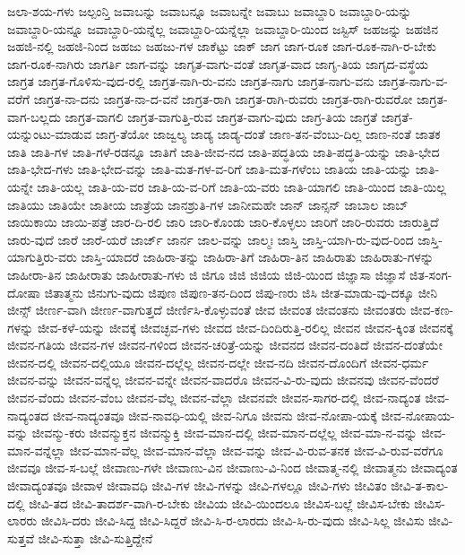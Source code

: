 {ಜಲಾ-ಶಯ-ಗಳು
ಜಲ್ಪಂನ್ತಿ
ಜವಾಬನ್ನು
ಜವಾಬನ್ನೂ
ಜವಾಬನ್ನೇ
ಜವಾಬು
ಜವಾಬ್ದಾರಿ
ಜವಾಬ್ದಾರಿ-ಯನ್ನು
ಜವಾಬ್ದಾರಿ-ಯನ್ನೂ
ಜವಾಬ್ದಾರಿ-ಯನ್ನೆಲ್ಲ
ಜವಾಬ್ದಾರಿ-ಯನ್ನೆಲ್ಲಾ
ಜವಾಬ್ದಾರಿ-ಯಿಂದ
ಜಸ್ಟಿಸ್
ಜಹಜನ್ನು
ಜಹಜಿನ
ಜಹಜಿ-ನಲ್ಲಿ
ಜಹಜಿ-ನಿಂದ
ಜಹಜು
ಜಹಜು-ಗಳ
ಜಾಕೆಟ್ಟು
ಜಾಕ್
ಜಾಗ
ಜಾಗ-ರೂಕ
ಜಾಗ-ರೂಕ-ನಾಗಿ-ರ-ಬೇಕು
ಜಾಗ-ರೂಕ-ನಾಗಿರು
ಜಾಗರ್ತಿ
ಜಾಗ-ವನ್ನು
ಜಾಗೃತ-ವಾಗು-ವಂತೆ
ಜಾಗೃತ-ವಾದ
ಜಾಗೃ-ತಿಯ
ಜಾಗೃದ-ವಸ್ಥೆಯ
ಜಾಗ್ರತ
ಜಾಗ್ರತ-ಗೊಳಿಸು-ವುದ-ರಲ್ಲಿ
ಜಾಗ್ರತ-ನಾಗಿ-ರು-ವನು
ಜಾಗ್ರತ-ನಾಗು
ಜಾಗ್ರತ-ನಾಗು-ವನು
ಜಾಗ್ರತ-ನಾಗು-ವ-ವರೆಗೆ
ಜಾಗ್ರತ-ನಾ-ದನು
ಜಾಗ್ರತ-ನಾ-ದ-ವನೆ
ಜಾಗ್ರತ-ರಾಗಿ
ಜಾಗ್ರತ-ರಾಗಿ-ರುವರು
ಜಾಗ್ರತ-ರಾಗಿ-ರುವರೋ
ಜಾಗ್ರತ-ವಾಗ-ಬಲ್ಲದು
ಜಾಗ್ರತ-ವಾಗಲಿ
ಜಾಗ್ರತ-ವಾಗುತ್ತಿ-ರುವ
ಜಾಗ್ರತ-ವಾಗು-ವುದು
ಜಾಗ್ರ-ತಿಯ
ಜಾಗ್ರತೆ
ಜಾಗ್ರತೆ-ಯನ್ನುಂಟು-ಮಾಡುವ
ಜಾಗ್ರ-ತೆಯೋ
ಜಾಜ್ವಲ್ಯ
ಜಾಡ್ಯ
ಜಾಡ್ಯ-ದಂತೆ
ಜಾಣ-ತನ-ವೆಂಬು-ದಿಲ್ಲ
ಜಾಣ-ನಂತೆ
ಜಾತಕ
ಜಾತಿ
ಜಾತಿ-ಗಳ
ಜಾತಿ-ಗಳೆ-ರಡನ್ನೂ
ಜಾತಿಗೆ
ಜಾತಿ-ಜೀವ-ನದ
ಜಾತಿ-ಪದ್ಧತಿಯ
ಜಾತಿ-ಪದ್ಧತಿ-ಯನ್ನು
ಜಾತಿ-ಭೇದ
ಜಾತಿ-ಭೇದ-ಗಳು
ಜಾತಿ-ಭೇದ-ವನ್ನು
ಜಾತಿ-ಮತ-ಗಳ-ವ-ರಿಗೆ
ಜಾತಿ-ಮತ-ಗಳೆಂಬ
ಜಾತಿಯ
ಜಾತಿ-ಯನ್ನು
ಜಾತಿ-ಯನ್ನೇ
ಜಾತಿ-ಯಲ್ಲ
ಜಾತಿ-ಯ-ವರ
ಜಾತಿ-ಯ-ವ-ರಿಗೆ
ಜಾತಿ-ಯ-ವರು
ಜಾತಿ-ಯಾಗಲಿ
ಜಾತಿ-ಯಿಂದ
ಜಾತಿ-ಯಿಲ್ಲ
ಜಾತಿಯು
ಜಾತಿಯೇ
ಜಾತೀಯ
ಜಾತ್ರೆಯ
ಜಾನಶ್ರುತಿ-ಗಳ
ಜಾನೀಮಹೇ
ಜಾನ್
ಜಾನ್ಸನ್
ಜಾಬಾಲ
ಜಾಬ್
ಜಾಯಿಕಾಯಿ
ಜಾಯಿ-ಪತ್ರೆ
ಜಾರ-ದಿ-ರಲಿ
ಜಾರಿ
ಜಾರಿ-ಕೊಂಡು
ಜಾರಿ-ಕೊಳ್ಳಲು
ಜಾರಿಗೆ
ಜಾರಿ-ರುವರು
ಜಾರುತ್ತಿದೆ
ಜಾರು-ವುದೆ
ಜಾರೆ
ಜಾರೆ-ಯರೆ
ಜಾರ್ಜ್
ಜಾರ್ನ
ಜಾಲ-ವನ್ನು
ಜಾಲ್ಮಃ
ಜಾಸ್ತಿ
ಜಾಸ್ತಿ-ಯಾಗಿ-ರು-ವುದ-ರಿಂದ
ಜಾಸ್ತಿ-ಯಾಗುತ್ತಿರು-ವರು
ಜಾಸ್ತಿ-ಯಾದರೆ
ಜಾಹಿರಾ-ತನ್ನು
ಜಾಹಿರಾ-ತಿಗೆ
ಜಾಹಿರಾ-ತಿನ
ಜಾಹಿರಾತು
ಜಾಹಿರಾತು-ಗಳನ್ನು
ಜಾಹೀರಾ-ತಿನ
ಜಾಹೀರಾತು
ಜಾಹೀರಾತು-ಗಳು
ಜಿ
ಜಿಗೂ
ಜಿಜಿ
ಜಿಜಿಯ
ಜಿಜಿ-ಯಿಂದ
ಜಿಜ್ಞಾಸಾ
ಜಿಜ್ಞಾಸೆ
ಜಿತ-ಸಂಗ-ದೋಷಾ
ಜಿತಾತ್ಮನು
ಜಿನುಗು-ವುದು
ಜಿಪುಣ
ಜಿಪುಣ-ತನ-ದಿಂದ
ಜಿಪು-ಣರು
ಜಿಸಿ
ಜೀತ-ಮಾಡು-ವು-ದಕ್ಕೂ
ಜೀನಿ
ಜೀನ್ಸ್
ಜೀರ್ಣ-ವಾಗಿ
ಜೀರ್ಣ-ವಾಗುತ್ತದೆ
ಜೀರ್ಣಿಸಿ-ಕೊಳ್ಳುವಂತೆ
ಜೀವ
ಜೀವಂತ
ಜೀವಂತನು
ಜೀವಂತರು
ಜೀವ-ಕಣ-ಗಳನ್ನು
ಜೀವ-ಕಳೆ-ಯನ್ನು
ಜೀವಕ್ಕೆ
ಜೀವಚ್ಛವ-ಗಳು
ಜೀವದ
ಜೀವ-ದಿಂದಿರುತ್ತಿ-ರಲಿಲ್ಲ
ಜೀವನ
ಜೀವನ-ಕ್ಕಿಂತ
ಜೀವನಕ್ಕೆ
ಜೀವನ-ಗತಿಯ
ಜೀವನ-ಗಳ
ಜೀವನ-ಗಳಿಂದ
ಜೀವನ-ಚರಿತ್ರೆ-ಯನ್ನು
ಜೀವನದ
ಜೀವನ-ದಂತಿದೆ
ಜೀವನ-ದಂತೆಯೇ
ಜೀವನ-ದಲ್ಲಿ
ಜೀವನ-ದಲ್ಲಿಯೂ
ಜೀವನ-ದಲ್ಲೆಲ್ಲ
ಜೀವನ-ದಲ್ಲೇ
ಜೀವ-ನದಿ
ಜೀವನ-ದೊಂದಿಗೆ
ಜೀವನ-ಧರ್ಮ
ಜೀವನ-ವನ್ನು
ಜೀವನ-ವನ್ನೆಲ್ಲ
ಜೀವನ-ವನ್ನೇ
ಜೀವನ-ವಾದರೊ
ಜೀವನ-ವಿ-ರು-ವುದು
ಜೀವನವು
ಜೀವನ-ವೆಂದರೆ
ಜೀವನ-ವೆಂದು
ಜೀವನ-ವೆಂಬ
ಜೀವನ-ವೆಲ್ಲ
ಜೀವನ-ವೆಲ್ಲಾ
ಜೀವನವೇ
ಜೀವನ-ಸಾಗರ-ದಲ್ಲಿ
ಜೀವ-ನಾದ್ಯಂತ
ಜೀವ-ನಾದ್ಯಂತದ
ಜೀವ-ನಾದ್ಯಂತವೂ
ಜೀವ-ನಾವಧಿ-ಯಲ್ಲಿ
ಜೀವ-ನಿಗೂ
ಜೀವನು
ಜೀವ-ನೋಪಾ-ಯಕ್ಕೆ
ಜೀವ-ನೋಪಾಯ-ವನ್ನು
ಜೀವನ್ಮು-ಕರು
ಜೀವನ್ಮುಕ್ತನ
ಜೀವನ್ಮುಕ್ತಿ
ಜೀವ-ಮಾನ-ದಲ್ಲಿ
ಜೀವ-ಮಾನ-ದಲ್ಲೆಲ್ಲ
ಜೀವ-ಮಾ-ನ-ವನ್ನು
ಜೀವ-ಮಾನ-ವನ್ನೆಲ್ಲಾ
ಜೀವ-ಮಾನ-ವೆಲ್ಲ
ಜೀವ-ಮಾನ-ವೆಲ್ಲಾ
ಜೀವ-ವನ್ನು
ಜೀವ-ವಿ-ರುವ-ತನಕ
ಜೀವ-ವಿ-ರುವ-ವರೆಗೂ
ಜೀವವೂ
ಜೀವ-ಸ-ಬಲ್ಲೆ
ಜೀವಾಣು-ಗಳೇ
ಜೀವಾಣು-ವಿನ
ಜೀವಾಣು-ವಿ-ನಿಂದ
ಜೀವಾತ್ಮ-ನಲ್ಲಿ
ಜೀವಾತ್ಮನು
ಜೀವಾದ್ಯಂತ
ಜೀವಾದ್ಯಂತವೂ
ಜೀವಾಳ
ಜೀವಾವಧಿ
ಜೀವಿ-ಗಳ
ಜೀವಿ-ಗಳನ್ನು
ಜೀವಿ-ಗಳಲ್ಲೂ
ಜೀವಿ-ಗಳು
ಜೀವಿತಂ
ಜೀವಿ-ತ-ಕಾಲ-ದಲ್ಲಿ
ಜೀವಿ-ತದ
ಜೀವಿ-ತಾದರ್ಶ-ವಾಗಿ-ರ-ಬೇಕು
ಜೀವಿಯ
ಜೀವಿ-ಯಿಂದಲೂ
ಜೀವಿಸ-ಬಲ್ಲೆ
ಜೀವಿಸ-ಬೇಕು
ಜೀವಿಸ-ಲಾರರು
ಜೀವಿಸಿ-ದರು
ಜೀವಿ-ಸಿದ್ದ
ಜೀವಿ-ಸಿದ್ದರೆ
ಜೀವಿ-ಸಿ-ರ-ಲಾರದು
ಜೀವಿ-ಸಿ-ರು-ವುದು
ಜೀವಿ-ಸಿಲ್ಲ
ಜೀವಿಸು
ಜೀವಿ-ಸುತ್ತವೆ
ಜೀವಿ-ಸುತ್ತಾ
ಜೀವಿ-ಸುತ್ತಿದ್ದೇನೆ
}
